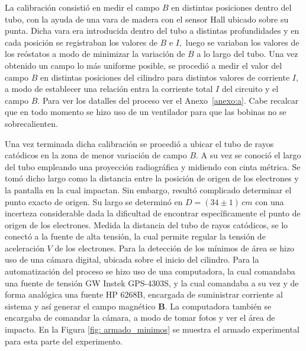 La calibración consistió en medir el campo $B$ en distintas posiciones dentro del tubo,
 con la ayuda de una vara de madera con el sensor Hall ubicado sobre su punta. 
 Dicha vara era introducida dentro del tubo a distintas profundidades y en cada posición
 se registraban los valores de $B$ e $I,$ luego se variaban los valores de los reóstatos a
 modo de minimizar la variación de $B$ a lo largo del tubo. Una vez obtenido un campo lo más uniforme posible,
  se procedió a medir el valor del campo $B$ en distintas posiciones del cilindro para
  distintos valores de corriente $I,$ a modo de establecer una relación entra la corriente total $I$
  del circuito y el campo $B.$ Para ver los datalles del proceso ver el Anexo~\ref{anexo:a}. Cabe recalcar que en todo momento
  se hizo uso de un ventilador para que las bobinas no se sobrecalienten.


Una vez terminada dicha calibración se procedió a ubicar el tubo de rayos catódicos en la zona de menor variación de campo $B.$ A su vez se conoció el largo del tubo empleando una proyección radiográfica y midiendo con cinta métrica.
Se tomó dicho largo como la distancia entre la posición de origen de los electrones y la pantalla en la cual impactan. Sin embargo, resultó complicado determinar el punto exacto de origen. 
Su largo se determinó en $D = (34 \pm 1)\,cm$ con una incerteza considerable dada la dificultad de encontrar específicamente el punto de origen de los electrones.
Medida la distancia del tubo de rayos catódicos, se lo conectó a la fuente de alta tensión, la cual permite regular la tensión de aceleración $V$ de los electrones. Para la detección de los mínimos de área se hizo
uso de una cámara digital, ubicada sobre el inicio del cilindro. Para la automatización del proceso se hizo uso de una computadora, la cual comandaba una fuente
de tensión GW Instek GPS-4303S, y la cual comandaba a su vez y de forma analógica una fuente HP 6268B, encargada de suministrar corriente al sistema y así generar el campo
magnético $\mathbf{B}$. La computadora también se encargaba de comandar la cámara, a modo de tomar fotos y ver el área de impacto. En la Figura \ref{fig: armado_minimos} se muestra el armado experimental para esta parte del experimento.

